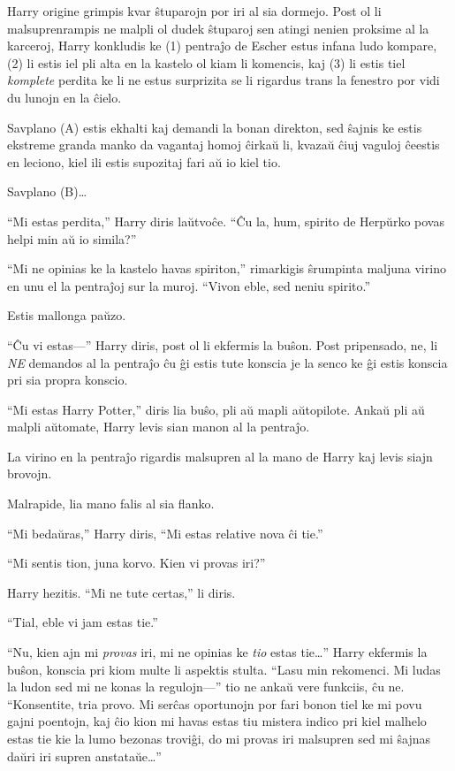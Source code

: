 Harry origine grimpis kvar ŝtuparojn por iri al sia dormejo. Post ol li
malsuprenrampis ne malpli ol dudek ŝtuparoj sen atingi nenien proksime al la
karceroj, Harry konkludis ke (1) pentraĵo de Escher estus infana ludo kompare,
(2) li estis iel pli alta en la kastelo ol kiam li komencis, kaj (3) li estis
tiel \emph{komplete} perdita ke li ne estus surprizita se li rigardus trans la
fenestro por vidi du lunojn en la ĉielo.

Savplano (A) estis ekhalti kaj demandi la bonan direkton, sed ŝajnis ke estis
ekstreme granda manko da vagantaj homoj ĉirkaŭ li, kvazaŭ ĉiuj vaguloj ĉeestis
en leciono, kiel ili estis supozitaj fari aŭ io kiel tio.

Savplano (B)\ldots

``Mi estas perdita,'' Harry diris laŭtvoĉe. ``Ĉu la, hum, spirito de
Herpŭrko povas helpi min aŭ io simila?''

``Mi ne opinias ke la kastelo havas spiriton,'' rimarkigis ŝrumpinta maljuna
virino en unu el la pentraĵoj sur la muroj. ``Vivon eble, sed neniu spirito.''

Estis mallonga paŭzo.

``Ĉu vi estas—'' Harry diris, post ol li ekfermis la buŝon. Post pripensado, ne,
li \emph{NE} demandos al la pentraĵo ĉu ĝi estis tute konscia je la senco ke ĝi
estis konscia pri sia propra konscio.

``Mi estas Harry Potter,'' diris lia buŝo, pli aŭ mapli aŭtopilote. Ankaŭ pli aŭ
malpli aŭtomate, Harry levis sian manon al la pentraĵo.

La virino en la pentraĵo rigardis malsupren al la mano de Harry kaj levis siajn
brovojn.

Malrapide, lia mano falis al sia flanko.

``Mi bedaŭras,'' Harry diris, ``Mi estas relative nova ĉi tie.''

``Mi sentis tion, juna korvo. Kien vi provas iri?''

Harry hezitis. ``Mi ne tute certas,'' li diris.

``Tial, eble vi jam estas tie.''

``Nu, kien ajn mi \emph{provas} iri, mi ne opinias ke \emph{tio} estas tie\ldots''
Harry ekfermis la buŝon, konscia pri kiom multe li aspektis stulta. ``Lasu min
rekomenci. Mi ludas la ludon sed mi ne konas la regulojn—'' tio ne ankaŭ vere
funkciis, ĉu ne. ``Konsentite, tria provo. Mi serĉas oportunojn por fari bonon
tiel ke mi povu gajni poentojn, kaj ĉio kion mi havas estas tiu mistera
indico pri kiel malhelo estas tie kie la lumo bezonas troviĝi, do mi provas iri
malsupren sed mi ŝajnas daŭri iri supren anstataŭe\ldots''

